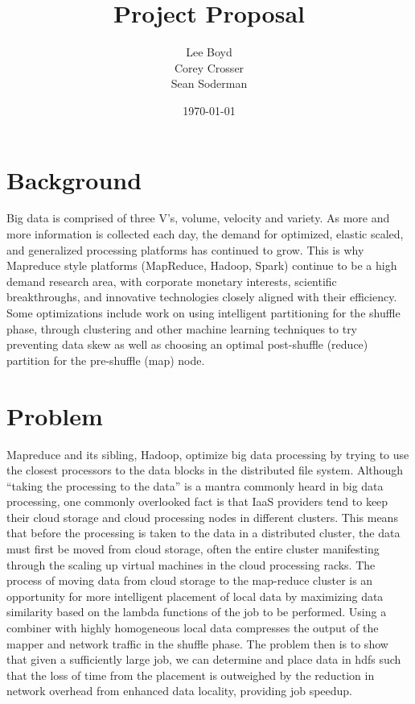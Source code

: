 \documentclass[12pt]{extarticle}
\begin{document}
\title{Project Proposal}
\author{Lee Boyd \\
        Corey Crosser \\
        Sean Soderman}
\date{\today}
\maketitle

\section{Background}
Big data is comprised of three V's, volume, velocity and variety. As more and more information is collected each day, the demand for optimized, elastic scaled, and generalized processing platforms has continued to grow. This is why Mapreduce style platforms (MapReduce, Hadoop, Spark) continue to be a high demand research area, with corporate monetary interests, scientific breakthroughs, and innovative technologies closely aligned with their efficiency.  Some optimizations include work on using intelligent partitioning for the shuffle phase, through clustering and other machine learning techniques to try preventing data skew as well as choosing an optimal post-shuffle (reduce) partition for the pre-shuffle (map) node.  


\section{Problem}
Mapreduce and its sibling, Hadoop, optimize big data processing by trying to use the closest processors to the data blocks in the distributed file system.  Although ``taking the processing to the data'' is a mantra commonly heard in big data processing, one commonly overlooked fact is that IaaS providers tend to keep their cloud storage and cloud processing nodes in different clusters.  
This means that before the processing is taken to the data in a distributed cluster, the data must first be moved from cloud storage, often the entire cluster manifesting through the scaling up virtual machines in the cloud processing racks.  The process of moving data from cloud storage to the map-reduce cluster is an opportunity for more intelligent placement of local data by maximizing data similarity based on the lambda functions of the job to be performed.  Using a combiner with highly homogeneous local data compresses the output of the mapper and network traffic in the shuffle phase.  The problem then is to show that given a sufficiently large job, we can determine and place data in hdfs such that the loss of time from the placement is outweighed by the reduction in network overhead from enhanced data 
locality, providing job speedup.
\end{document}

